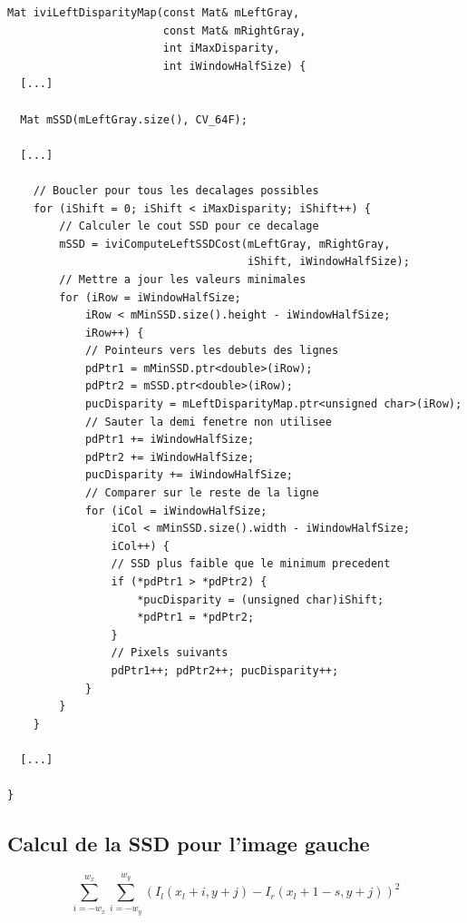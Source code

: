 \documentclass[a4paper]{article}
\begin{document}
\begin{lstlisting}
Mat iviLeftDisparityMap(const Mat& mLeftGray,
                        const Mat& mRightGray,
                        int iMaxDisparity,
                        int iWindowHalfSize) {
  [...]

  Mat mSSD(mLeftGray.size(), CV_64F);

  [...]

    // Boucler pour tous les decalages possibles
    for (iShift = 0; iShift < iMaxDisparity; iShift++) {
        // Calculer le cout SSD pour ce decalage
        mSSD = iviComputeLeftSSDCost(mLeftGray, mRightGray,
                                     iShift, iWindowHalfSize);
        // Mettre a jour les valeurs minimales
        for (iRow = iWindowHalfSize;
            iRow < mMinSSD.size().height - iWindowHalfSize;
            iRow++) {
            // Pointeurs vers les debuts des lignes
            pdPtr1 = mMinSSD.ptr<double>(iRow);
            pdPtr2 = mSSD.ptr<double>(iRow);
            pucDisparity = mLeftDisparityMap.ptr<unsigned char>(iRow);
            // Sauter la demi fenetre non utilisee
            pdPtr1 += iWindowHalfSize;
            pdPtr2 += iWindowHalfSize;
            pucDisparity += iWindowHalfSize;
            // Comparer sur le reste de la ligne
            for (iCol = iWindowHalfSize;
                iCol < mMinSSD.size().width - iWindowHalfSize;
                iCol++) {
                // SSD plus faible que le minimum precedent
                if (*pdPtr1 > *pdPtr2) {
                    *pucDisparity = (unsigned char)iShift;
                    *pdPtr1 = *pdPtr2;
                }
                // Pixels suivants
                pdPtr1++; pdPtr2++; pucDisparity++;
            }
        }
    }

  [...]

}
\end{lstlisting}

\subsection{Calcul de la SSD pour l'image gauche}

\begin{equation}
\sum_{i=-w_x}^{w_x} \sum_{i=-w_y}^{w_y} (I_l(x_l+i,y+j)-I_r(x_l+1-s,y+j))^2
\end{equation}

\begin{lstlisting}
  
\end{lstlisting}
\clearpage
\end{document}
